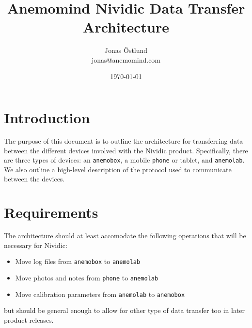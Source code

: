 \documentclass{article}
\author{Jonas Östlund\\jonas@anemomind.com}
\date{\today}
\title{Anemomind Nividic Data Transfer Architecture}
\newcommand{\device}[1]{\texttt{#1}}
\newcommand{\anemobox}{\device{anemobox}}
\newcommand{\phone}{\device{phone}}
\newcommand{\anemolab}{\texttt{anemolab}}
\begin{document}
\maketitle
\section{Introduction}
The purpose of this document is to outline the architecture for transferring data between the different devices involved with the Nividic product. Specifically, there are three types of devices: an \anemobox{}, a mobile \phone{} or tablet, and \anemolab{}. We also outline a high-level description of the protocol used to communicate between the devices.

\section{Requirements}
The architecture should at least accomodate the following operations that will be necessary for Nividic:
\begin{itemize}
  \item Move log files from \anemobox{} to \anemolab{}
  \item Move photos and notes from \phone{} to \anemolab{}
  \item Move calibration parameters from \anemolab{} to \anemobox{}
\end{itemize}
but should be general enough to allow for other type of data transfer too in later product releases.
\end{document}
